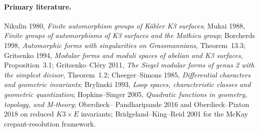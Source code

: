\paragraph{Primary literature.}
Nikulin 1980, \emph{Finite automorphism groups of K\"ahler K3 surfaces};
Mukai 1988, \emph{Finite groups of automorphisms of K3 surfaces and
the Mathieu group}; Borcherds 1998, \emph{Automorphic forms with
singularities on Grassmannians}, Theorem~13.3; Gritsenko 1994,
\emph{Modular forms and moduli spaces of abelian and K3 surfaces},
Proposition~3.1; Gritsenko--Cl\'ery 2011, \emph{The Siegel modular forms
of genus 2 with the simplest divisor}, Theorem~1.2; Cheeger--Simons
1985, \emph{Differential characters and geometric invariants};
Brylinski 1993, \emph{Loop spaces, characteristic classes and
geometric quantization}; Hopkins--Singer 2005, \emph{Quadratic
functions in geometry, topology, and M-theory}; Oberdieck--
Pandharipande 2016 and Oberdieck--Pixton 2018 on reduced
\(K3\times E\) invariants; Bridgeland--King--Reid 2001 for the McKay
crepant-resolution framework.
